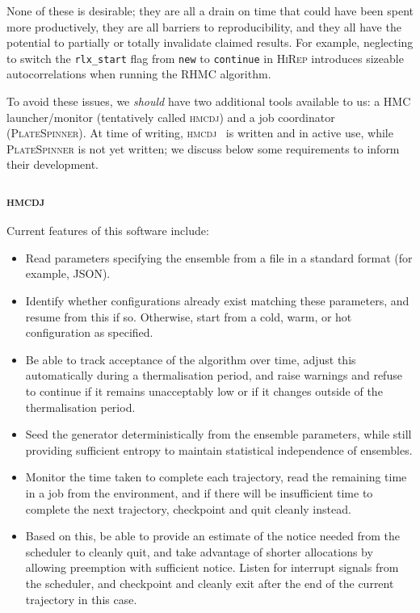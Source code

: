 \documentclass{article}
\newcommand\rfcword[1]{\emph{#1}\xspace}
\newcommand\should{\rfcword{should}}
\newcommand\program[1]{\textsc{#1}\xspace}
\begin{document}
None of these is desirable;
they are all a drain on time that could have been spent more productively,
they are all barriers to reproducibility,
and they all have the potential to partially or totally invalidate claimed results.
For example,
neglecting to switch the \verb|rlx_start| flag from \verb|new| to \verb|continue|
in \program{HiRep}
introduces sizeable autocorrelations when running the RHMC algorithm.

To avoid these issues,
we \should have two additional tools available to us:
a HMC launcher/monitor
(tentatively called \program{hmcdj})
and a job coordinator
(\program{PlateSpinner}).
At time of writing,
\program{hmcdj}~\cite{hmcdj} is written and in active use,
while \program{PlateSpinner} is not yet written;
we discuss below some requirements to inform their development.

\subsubsection{\program{hmcdj}}

Current features of this software include:

\begin{itemize}
  \item
        Read parameters specifying the ensemble from a file in a standard format
        (for example, JSON).
  \item
        Identify whether configurations already exist matching these parameters,
        and resume from this if so.
        Otherwise,
        start from a cold, warm, or hot configuration as specified.
  \item
        Be able to track acceptance of the algorithm over time,
        adjust this automatically during a thermalisation period,
        and raise warnings and refuse to continue if it remains unacceptably low
        or if it changes outside of the thermalisation period.
  \item
        Seed the generator deterministically from the ensemble parameters,
        while still providing sufficient entropy to maintain statistical independence of ensembles.
  \item
        Monitor the time taken to complete each trajectory,
        read the remaining time in a job from the environment,
        and if there will be insufficient time to complete the next trajectory,
        checkpoint and quit cleanly instead.
  \item
        Based on this,
        be able to provide an estimate of the notice needed from the scheduler to cleanly quit,
        and take advantage of shorter allocations by allowing preemption with sufficient notice.
        Listen for interrupt signals from the scheduler,
        and checkpoint and cleanly exit after the end of the current trajectory in this case.
\end{itemize}
\end{document}
